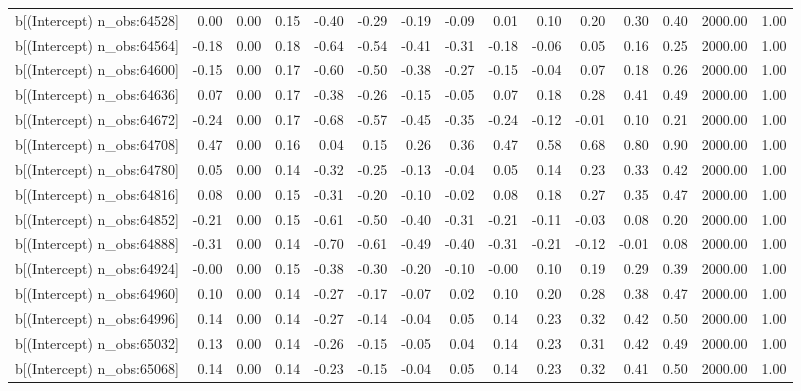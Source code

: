 \begin{table}[ht]
\begin{tabular}{rrrrrrrrrrrrrrr}
  b[(Intercept) n\_obs:64528] & 0.00 & 0.00 & 0.15 & -0.40 & -0.29 & -0.19 & -0.09 & 0.01 & 0.10 & 0.20 & 0.30 & 0.40 & 2000.00 & 1.00 \\ 
  b[(Intercept) n\_obs:64564] & -0.18 & 0.00 & 0.18 & -0.64 & -0.54 & -0.41 & -0.31 & -0.18 & -0.06 & 0.05 & 0.16 & 0.25 & 2000.00 & 1.00 \\ 
  b[(Intercept) n\_obs:64600] & -0.15 & 0.00 & 0.17 & -0.60 & -0.50 & -0.38 & -0.27 & -0.15 & -0.04 & 0.07 & 0.18 & 0.26 & 2000.00 & 1.00 \\ 
  b[(Intercept) n\_obs:64636] & 0.07 & 0.00 & 0.17 & -0.38 & -0.26 & -0.15 & -0.05 & 0.07 & 0.18 & 0.28 & 0.41 & 0.49 & 2000.00 & 1.00 \\ 
  b[(Intercept) n\_obs:64672] & -0.24 & 0.00 & 0.17 & -0.68 & -0.57 & -0.45 & -0.35 & -0.24 & -0.12 & -0.01 & 0.10 & 0.21 & 2000.00 & 1.00 \\ 
  b[(Intercept) n\_obs:64708] & 0.47 & 0.00 & 0.16 & 0.04 & 0.15 & 0.26 & 0.36 & 0.47 & 0.58 & 0.68 & 0.80 & 0.90 & 2000.00 & 1.00 \\ 
  b[(Intercept) n\_obs:64780] & 0.05 & 0.00 & 0.14 & -0.32 & -0.25 & -0.13 & -0.04 & 0.05 & 0.14 & 0.23 & 0.33 & 0.42 & 2000.00 & 1.00 \\ 
  b[(Intercept) n\_obs:64816] & 0.08 & 0.00 & 0.15 & -0.31 & -0.20 & -0.10 & -0.02 & 0.08 & 0.18 & 0.27 & 0.35 & 0.47 & 2000.00 & 1.00 \\ 
  b[(Intercept) n\_obs:64852] & -0.21 & 0.00 & 0.15 & -0.61 & -0.50 & -0.40 & -0.31 & -0.21 & -0.11 & -0.03 & 0.08 & 0.20 & 2000.00 & 1.00 \\ 
  b[(Intercept) n\_obs:64888] & -0.31 & 0.00 & 0.14 & -0.70 & -0.61 & -0.49 & -0.40 & -0.31 & -0.21 & -0.12 & -0.01 & 0.08 & 2000.00 & 1.00 \\ 
  b[(Intercept) n\_obs:64924] & -0.00 & 0.00 & 0.15 & -0.38 & -0.30 & -0.20 & -0.10 & -0.00 & 0.10 & 0.19 & 0.29 & 0.39 & 2000.00 & 1.00 \\ 
  b[(Intercept) n\_obs:64960] & 0.10 & 0.00 & 0.14 & -0.27 & -0.17 & -0.07 & 0.02 & 0.10 & 0.20 & 0.28 & 0.38 & 0.47 & 2000.00 & 1.00 \\ 
  b[(Intercept) n\_obs:64996] & 0.14 & 0.00 & 0.14 & -0.27 & -0.14 & -0.04 & 0.05 & 0.14 & 0.23 & 0.32 & 0.42 & 0.50 & 2000.00 & 1.00 \\ 
  b[(Intercept) n\_obs:65032] & 0.13 & 0.00 & 0.14 & -0.26 & -0.15 & -0.05 & 0.04 & 0.14 & 0.23 & 0.31 & 0.42 & 0.49 & 2000.00 & 1.00 \\ 
  b[(Intercept) n\_obs:65068] & 0.14 & 0.00 & 0.14 & -0.23 & -0.15 & -0.04 & 0.05 & 0.14 & 0.23 & 0.32 & 0.41 & 0.50 & 2000.00 & 1.00 \\ 

\end{tabular}
\end{table}
